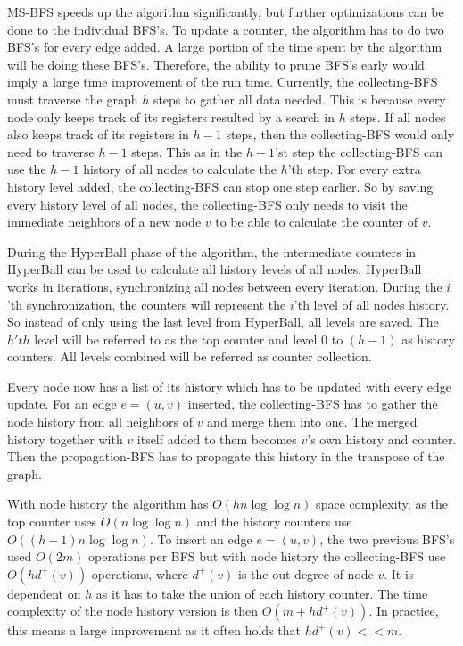 MS-BFS speeds up the algorithm significantly, but further optimizations can be done to the individual BFS's. To update a counter, the algorithm has to do two BFS's for every edge added. A large portion of the time spent by the algorithm will be doing these BFS's. Therefore, the ability to prune BFS's early would imply a large time improvement of the run time. Currently, the collecting-BFS must traverse the graph $h$ steps to gather all data needed. This is because every node only keeps track of its registers resulted by a search in $h$ steps. If all nodes also keeps track of its registers in $h-1$ steps, then the collecting-BFS would only need to traverse $h-1$ steps. This as in the $h-1$'st step the collecting-BFS can use the $h-1$ history of all nodes to calculate the $h$'th step. For every extra history level added, the collecting-BFS can stop one step earlier. So by saving every history level of all nodes, the collecting-BFS only needs to visit the immediate neighbors of a new node $v$ to be able to calculate the counter of $v$. 

During the HyperBall phase of the algorithm, the intermediate counters in HyperBall can be used to calculate all history levels of all nodes. HyperBall works in iterations, synchronizing all nodes between every iteration. During the $i$'th synchronization, the counters will represent the $i$'th level of all nodes history. So instead of only using the last level from HyperBall, all levels are saved. The $h'th$ level will be referred to as the top counter and level $0$ to $(h-1)$ as history counters. All levels combined will be referred as counter collection.  

Every node now has a list of its history which has to be updated with every edge update. For an edge $e = (u,v)$ inserted, the collecting-BFS has to gather the node history from all neighbors of $v$ and merge them into one. The merged history together with $v$ itself added to them becomes $v$'s own history and counter. Then the propagation-BFS has to propagate this history in the transpose of the graph. 

With node history the algorithm has $O(hn \log \log n)$ space complexity, as the top counter uses $O(n \log \log n)$ and the history counters use $O((h-1)n \log \log n)$. To insert an edge $e = (u,v)$, the two previous BFS's used $O(2m)$ operations per BFS but with node history the collecting-BFS use $O(hd^+(v))$ operations, where $d^+(v)$ is the out degree of node $v$. It is dependent on $h$ as it has to take the union of each history counter. The time complexity of the node history version is then $O(m + hd^+(v))$. In practice, this means a large improvement as it often holds that $hd^+(v) << m$.

